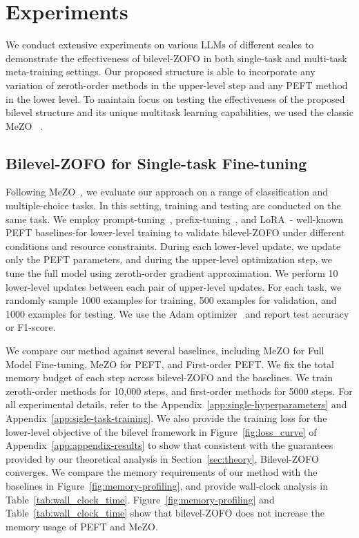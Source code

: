 \section{Experiments}

We conduct extensive experiments on various LLMs of different scales to demonstrate the effectiveness of bilevel-ZOFO in both single-task and multi-task meta-training settings. Our proposed structure is able to incorporate any variation of zeroth-order methods in the upper-level step and any PEFT method in the lower level. To maintain focus on testing the effectiveness of the proposed bilevel structure and its unique multitask learning capabilities, we used the classic MeZO ~\cite{MalladiGNDL0A23Mezo}. 

\subsection{Bilevel-ZOFO for Single-task Fine-tuning}
Following MeZO~\citep{MalladiGNDL0A23Mezo}, we evaluate our approach on a range of classification and multiple-choice tasks. In this setting, training and testing are conducted on the same task. We employ prompt-tuning~\citep{LesterAC21PromptTuning}, prefix-tuning~\citep{LiL20PrefixTuning}, and LoRA~\citep{HuSWALWWC22LORA}- well-known PEFT baselines-for lower-level training to validate bilevel-ZOFO under different conditions and resource constraints. During each lower-level update, we update only the PEFT parameters, and during the upper-level optimization step, we tune the full model using zeroth-order gradient approximation. We perform 10 lower-level updates between each pair of upper-level updates. For each task, we randomly sample 1000 examples for training, 500 examples for validation, and 1000 examples for testing. We use the Adam optimizer~\citep{AdamKingmaB14} and report test accuracy or F1-score.

We compare our method against several baselines, including MeZO for Full Model Fine-tuning, MeZO for  PEFT, and First-order PEFT. We fix the total memory budget of each step across bilevel-ZOFO and the baselines. We train zeroth-order methods for 10,000 steps, and first-order methods for 5000 steps. For all experimental details, refer to the Appendix~\ref{app:single-hyperparameters} and Appendix~\ref{app:sigle-task-training}. We also provide the training loss for the lower-level objective of the bilevel framework in Figure~\ref{fig:loss_curve} of Appendix~\ref{app:appendix-results} to show that consistent with the guarantees provided by our theoretical analysis in Section~\ref{sec:theory}, Bilevel-ZOFO converges. We compare the memory requirements of our method with the baselines in Figure~\ref{fig:memory-profiling}, and provide wall-clock analysis in Table~\ref{tab:wall_clock_time}. Figure~\ref{fig:memory-profiling} and Table~\ref{tab:wall_clock_time} show that bilevel-ZOFO does not increase the memory usage of PEFT and MeZO.


